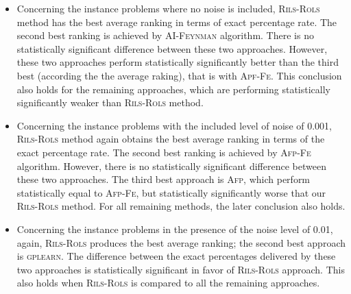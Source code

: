 \documentclass[a4paper,12pt]{elsarticle}
\begin{document}
\begin{itemize}
	\item  Concerning the instance problems where no noise is included, \textsc{Rils}-\textsc{Rols} method has the best average ranking in terms of   exact percentage rate.  The second best ranking is achieved by \textsc{AI-Feynman} algorithm. There is no statistically significant difference between these two approaches. However, these two approaches perform statistically significantly better than the third best (according the the average raking), that is with \textsc{Apf-Fe}. This conclusion also holds for the remaining approaches, which are performing statistically significantly weaker than  \textsc{Rils}-\textsc{Rols} method. 
	\item    Concerning the instance problems with the included level of noise of 0.001, \textsc{Rils}-\textsc{Rols} method again obtains the best average ranking in terms of the exact percentage rate.   The second best ranking is achieved by \textsc{Afp-Fe} algorithm. However,  there is no statistically significant difference between these two approaches. The third best approach is \textsc{Afp}, which perform statistically equal to \textsc{Afp-Fe}, but statistically significantly worse that our \textsc{Rils}-\textsc{Rols} method. For all remaining methods, the later conclusion also holds.
	\item   Concerning the instance problems in the presence of the noise level of  0.01, again, \textsc{Rils-Rols} produces the best average ranking; the second best approach is \textsc{gplearn}. The difference between the exact percentages delivered by these two approaches is statistically significant in favor of \textsc{Rils-Rols} approach. This also holds when \textsc{Rils-Rols} is compared to all the remaining approaches. 
	
\end{itemize}
\end{document}
